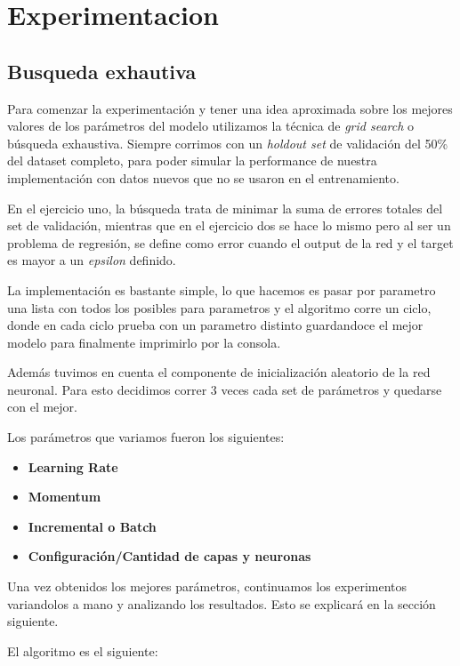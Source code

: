 \section{Experimentacion}
\subsection{Busqueda exhautiva}
Para comenzar la experimentación y tener una idea aproximada sobre los mejores valores de los parámetros del modelo utilizamos la técnica de \textit{grid search} o búsqueda exhaustiva. Siempre corrimos con un \textit{holdout set} de validación del 50\% del dataset completo, para poder simular la performance de nuestra implementación con datos nuevos que no se usaron en el entrenamiento. 

En el ejercicio uno, la búsqueda trata de minimar la suma de errores totales del set de validación, mientras que en el ejercicio dos se hace lo mismo pero al ser un problema de regresión, se define como error cuando el output de la red y el target es mayor a un \textit{epsilon} definido. 

La implementación es bastante simple, lo que hacemos es pasar por parametro una lista con todos los posibles para parametros y el algoritmo corre un ciclo, donde en cada ciclo prueba con un parametro distinto guardandoce el mejor modelo para finalmente imprimirlo por la consola. 

Además tuvimos en cuenta el componente de inicialización aleatorio de la red neuronal. Para esto decidimos correr 3 veces cada set de parámetros y quedarse con el mejor. 

Los parámetros que variamos fueron los siguientes:
\begin{itemize}
\item \textbf{Learning Rate}
\item \textbf{Momentum}
\item \textbf{Incremental o Batch}
\item \textbf{Configuración/Cantidad de capas y neuronas}
\end{itemize}

Una vez obtenidos los mejores parámetros, continuamos los experimentos variandolos a mano y analizando los resultados. Esto se explicará en la sección siguiente.

El algoritmo es el siguiente:

